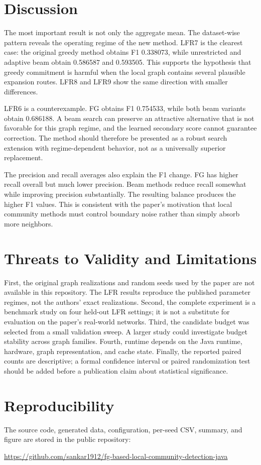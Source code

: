 \documentclass[10pt,journal,compsoc]{IEEEtran}
\begin{document}
\section{Discussion}
The most important result is not only the aggregate mean. The dataset-wise
pattern reveals the operating regime of the new method. LFR7 is the clearest
case: the original greedy method obtains F1 0.338073, while unrestricted and
adaptive beam obtain 0.586587 and 0.593505. This supports the hypothesis that
greedy commitment is harmful when the local graph contains several plausible
expansion routes. LFR8 and LFR9 show the same direction with smaller
differences.

LFR6 is a counterexample. FG obtains F1 0.754533, while both beam variants
obtain 0.686188. A beam search can preserve an attractive alternative that is
not favorable for this graph regime, and the learned secondary score cannot
guarantee correction. The method should therefore be presented as a robust
search extension with regime-dependent behavior, not as a universally superior
replacement.

The precision and recall averages also explain the F1 change. FG has higher
recall overall but much lower precision. Beam methods reduce recall somewhat
while improving precision substantially. The resulting balance produces the
higher F1 values. This is consistent with the paper's motivation that local
community methods must control boundary noise rather than simply absorb more
neighbors.

\section{Threats to Validity and Limitations}
First, the original graph realizations and random seeds used by the paper are
not available in this repository. The LFR results reproduce the published
parameter regimes, not the authors' exact realizations. Second, the complete
experiment is a benchmark study on four held-out LFR settings; it is not a
substitute for evaluation on the paper's real-world networks. Third, the
candidate budget was selected from a small validation sweep. A larger study
could investigate budget stability across graph families. Fourth, runtime
depends on the Java runtime, hardware, graph representation, and cache state.
Finally, the reported paired counts are descriptive; a formal confidence
interval or paired randomization test should be added before a publication
claim about statistical significance.

\section{Reproducibility}
The source code, generated data, configuration, per-seed CSV, summary, and
figure are stored in the public repository:
\begin{center}
\url{https://github.com/sankar1912/fg-based-local-community-detection-java}
\end{center}
\end{document}
